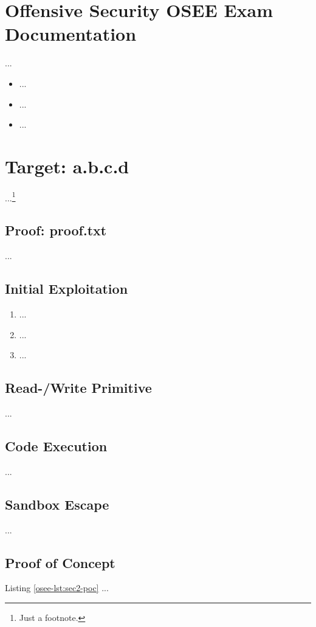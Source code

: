 %
%
%
\section{Offensive Security OSEE Exam Documentation}\label{osee-sec:sec1}
%
...~\cite{MitreAttack}

\begin{itemize}
    \item ...
    \item ...
    \item ...
\end{itemize}
%
%
%
\section{Target: a.b.c.d}\label{osee-sec:sec2}
%
...\footnote{Just a footnote.}
%
%
%
\subsection{Proof: proof.txt}\label{osee-sec:sec2-proof}
%
...
%
%
%
\subsection{Initial Exploitation}\label{osee-sec:sec2-init}
%
\begin{enumerate}
    \item ...
    \item ...
    \item ...
\end{enumerate}
%
%
%
\subsection{Read-/Write Primitive}\label{osee-sec:sec2-rwprim}
%
...
%
%
%
\subsection{Code Execution}\label{osee-sec:sec2-codeexec}
%
...
%
%
%
\subsection{Sandbox Escape}\label{osee-sec:sec2-escape}
%
...
%
%
%
\subsection{Proof of Concept}\label{osee-sec:sec2-poc}
%
Listing \ref{osee-lst:sec2-poc} ...\\

